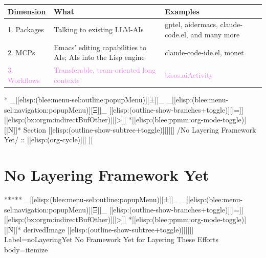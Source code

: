 \begin{whenOrg}
\begin{verblatex}
\begin{frame}[fragile,plain,label=threeDimensions]
{\footnotesize \renewcommand{\arraystretch}{1.35}
  \begin{tabular}{|p{0.85in}|p{2.2in}|p{2.2in}|}
    \hline
    \textbf{Dimension} & \textbf{What} & \textbf{Examples} \\
    \hline
    1. Packages & Talking to existing LLM-AIs & gptel, aidermacs, claude-code.el, and many more \\
    \hline
    2. MCPs & Emacs' editing capabilities to AIs; AIs into the Lisp engine & claude-code-ide.el, monet \\
    \hline
    \textcolor{violet}{3. Workflows} & \textcolor{violet}{Transferable, team-oriented long contexts} & \textcolor{violet}{bisos.aiActivity} \\
    \hline
  \end{tabular}
  }


\end{frame}
\end{verblatex}



\begin{whenOrg}
*  _[[elisp:(blee:menu-sel:outline:popupMenu)][±]]_ _[[elisp:(blee:menu-sel:navigation:popupMenu)][Ξ]]_ [[elisp:(outline-show-branches+toggle)][|=]] [[elisp:(bx:orgm:indirectBufOther)][|>]] *[[elisp:(blee:ppmm:org-mode-toggle)][|N]]*  Section    [[elisp:(outline-show-subtree+toggle)][||]]   /No Layering Framework Yet/ ::  [[elisp:(org-cycle)][| ]]
\end{whenOrg}

\section{No Layering Framework Yet}

\begin{whenOrg}
*****  _[[elisp:(blee:menu-sel:outline:popupMenu)][±]]_ _[[elisp:(blee:menu-sel:navigation:popupMenu)][Ξ]]_ [[elisp:(outline-show-branches+toggle)][|=]] [[elisp:(bx:orgm:indirectBufOther)][|>]] *[[elisp:(blee:ppmm:org-mode-toggle)][|N]]*  derivedImage [[elisp:(outline-show-subtree+toggle)][||]] Label=noLayeringYet No Framework Yet for Layering These Efforts body=itemize
\end{whenOrg}


\end{whenOrg}
